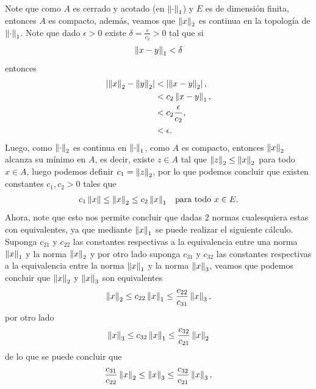 \begin{homeworkProblem}
\begin{solution}
\begin{enumerate}[(i)]
        Note que como $A$ es cerrado y acotado (en $\left\|\cdot\right\|_{1}$) y $E$ es de dimensión finita, entonces $A$ es compacto, además, veamos que $\left\|x\right\|_{2}$ es continua en la topología de $\left\|\cdot\right\|_{1}$.
        Note que dado $\epsilon>0$ existe $\delta=\frac{\epsilon}{c_2}>0$ tal que si
        \begin{align*}
          \left\|x-y\right\|_{1}<\delta
        \end{align*}
        entonces
        \begin{align*}
          \left| \left\|x\right\|_{2}-\left\|y\right\|_{2} \right|&<\left| \left\|x-y\right\|_{2} \right|,\\
          &<c_2\left\|x-y\right\|_{1},\\
          &<c_2\frac{\epsilon}{c_2},\\
          &<\epsilon.
        \end{align*}
        Luego, como $\left\|\cdot\right\|_{2}$ es continua en $\left\|\cdot\right\|_{1}$, como $A$ es compacto, entonces $\left\|x\right\|_{2}$ alcanza su mínimo en $A$, es decir, existe $z\in A$ tal que $\left\|z\right\|_{2}\leq \left\|x\right\|_{2}$ para todo $x\in A$, luego podemos definir $c_1=\left\|z\right\|_{2}$, por lo que podemos concluir que existen constantes $c_1,c_2>0$ tales que
        \begin{align*}
          c_1\left\|x\right\|\leq \left\|x\right\|_{2}\leq c_2\left\|x\right\|_{1} &&\text{para todo $x\in E$.}
        \end{align*}
        Ahora, note que esto nos permite concluir que dadas $2$ normas cualesquiera estas con equivalentes, ya que mediante $\left\|x\right\|_1$ se puede realizar el siguiente cálculo.\\
        Suponga $c_{21}$ y $c_{22}$ las constantes respectivas a la equivalencia entre una norma $\left\|x\right\|_{1}$ y la norma $\left\|x\right\|_{2}$ y por otro lado suponga $c_{31}$ y $c_{32}$ las constantes respectivas a la equivalencia entre la norma $\left\|x\right\|_{1}$ y la norma $\left\|x\right\|_{3}$, veamos que podemos concluir que $\left\|x\right\|_{2}$ y $\left\|x\right\|_{3}$ son equivalentes 
        \begin{align*}
          \left\|x\right\|_{2}\leq c_{22}\left\|x\right\|_1\leq \frac{c_{22}}{c_{31}}\left\|x\right\|_{3},
        \end{align*}
        por otro lado
        \begin{align*}
          \left\|x\right\|_{3}\leq c_{32}\left\|x\right\|_{1}\leq \frac{c_{32}}{c_{21}}\left\|x\right\|_{2}
        \end{align*}
        de lo que se puede concluir que
        \begin{align*}
          \frac{c_{31}}{c_{22}}\norm{x}_{2}\leq\norm{x}_{3}\leq \frac{c_{32}}{c_{21}}\norm{x}_{3},

\end{align*}
\end{enumerate}
\end{solution}
\end{homeworkProblem}
